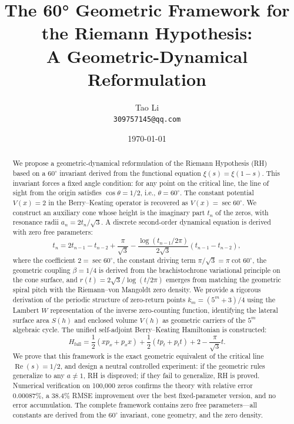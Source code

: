 \documentclass[12pt,a4paper]{article}
\title{The 60° Geometric Framework for the Riemann Hypothesis: \\
A Geometric-Dynamical Reformulation}
\author{Tao Li \\ \texttt{309757145@qq.com}}
\date{\today}
\begin{document}
\maketitle

\begin{abstract}
We propose a geometric-dynamical reformulation of the Riemann Hypothesis (RH) based on a $60^\circ$ invariant derived from the functional equation $\xi(s)=\xi(1-s)$. 
This invariant forces a fixed angle condition: for any point on the critical line, the line of sight from the origin satisfies $\cos\theta = 1/2$, i.e., $\theta = 60^\circ$.
The constant potential $V(x)=2$ in the Berry--Keating operator is recovered as $V(x)=\sec 60^\circ$.
We construct an auxiliary cone whose height is the imaginary part $t_n$ of the zeros, with resonance radii $a_n = 2t_n/\sqrt{3}$.
A discrete second-order dynamical equation is derived with zero free parameters:
\begin{equation}
t_n = 2t_{n-1} - t_{n-2} + \frac{\pi}{\sqrt{3}} - \frac{\log(t_{n-1}/2\pi)}{2\sqrt{3}}(t_{n-1} - t_{n-2}),
\end{equation}
where the coefficient $2 = \sec 60^\circ$, the constant driving term $\pi/\sqrt{3} = \pi\cot 60^\circ$, the geometric coupling $\beta = 1/4$ is derived from the brachistochrone variational principle on the cone surface, and $r(t) = 2\sqrt{3}/\log(t/2\pi)$ emerges from matching the geometric spiral pitch with the Riemann--von Mangoldt zero density.
We provide a rigorous derivation of the periodic structure of zero-return points $k_m = (5^m+3)/4$ using the Lambert $W$ representation of the inverse zero-counting function, identifying the lateral surface area $S(h)$ and enclosed volume $V(h)$ as geometric carriers of the $5^m$ algebraic cycle.
The unified self-adjoint Berry--Keating Hamiltonian is constructed:
\begin{equation}
H_{\text{full}} = \frac{1}{2}(x p_x + p_x x) + \frac{1}{2}(t p_t + p_t t) + 2 - \frac{\pi}{\sqrt{3}}t.
\end{equation}
We prove that this framework is the exact geometric equivalent of the critical line $\operatorname{Re}(s)=1/2$, and design a neutral controlled experiment: if the geometric rules generalize to any $a \neq 1$, RH is disproved; if they fail to generalize, RH is proved.
Numerical verification on 100,000 zeros confirms the theory with relative error $0.00087\%$, a 38.4\% RMSE improvement over the best fixed-parameter version, and no error accumulation.
The complete framework contains zero free parameters---all constants are derived from the $60^\circ$ invariant, cone geometry, and the zero density.
\end{abstract}
\end{document}
